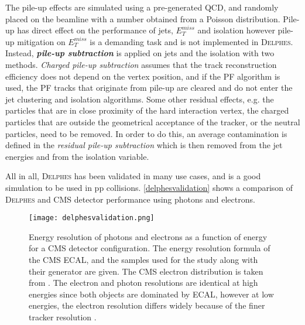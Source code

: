 {The pile-up effects are simulated using a pre-generated QCD, and randomly placed on the beamline with a number obtained from a Poisson distribution. Pile-up has direct effect on the performance of jets, $E_T^{miss}$ and isolation however pile-up mitigation on $E_T^{miss}$ is a demanding task and is not implemented in \textsc{Delphes}. Instead, \emph{\textbf{pile-up subtraction}} is applied on jets and the isolation with two methods. \emph{Charged pile-up subtraction} assumes that the track reconstruction efficiency does not depend on the vertex position, and if the PF algorithm is used, the PF tracks that originate from pile-up are cleared and do not enter the jet clustering and isolation algorithms. Some other residual effects, e.g. the particles that are in close proximity of the hard interaction vertex, the charged particles that are outside the geometrical acceptance of the tracker, or the neutral particles, need to be removed. In order to do this, an average contamination is defined in the \emph{residual pile-up subtraction} which is then removed from the jet energies and from the isolation variable.

All in all, \textsc{Delphes} has been validated in many use cases, and is a good simulation to be used in pp collisions. \autoref{delphesvalidation} shows a comparison of \textsc{Delphes} and CMS detector performance using photons and electrons.

\begin{figure}[ht]
	\centering
	\texttt{[image: delphesvalidation.png]}
	\vspace{2mm}
	\caption[Energy resolution of photons and electrons as a function of energy for a CMS detector configuration.  The energy resolution formula of the CMS ECAL, and the samples used for the study along with their generator are given. The CMS electron distribution is taken from . The electron and photon resolutions are identical at high energies since both objects are dominated by ECAL, however at low energies, the electron resolution differs widely because of the finer tracker resolution.]
	{Energy resolution of photons and electrons as a function of energy for a CMS detector configuration.  The energy resolution formula of the CMS ECAL, and the samples used for the study along with their generator are given. The CMS electron distribution is taken from \cite{CMS:2013hoa}. The electron and photon resolutions are identical at high energies since both objects are dominated by ECAL, however at low energies, the electron resolution differs widely because of the finer tracker resolution \cite{deFavereau2014}.}
	\label{delphesvalidation}
\end{figure}

}
